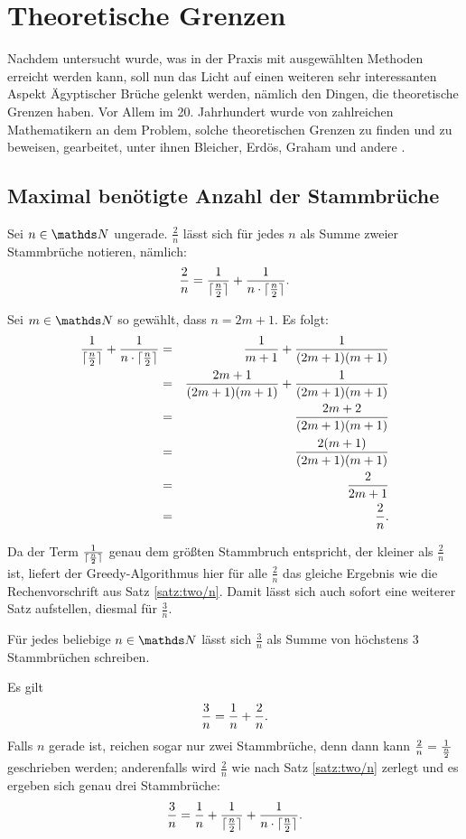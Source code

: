 \section{Theoretische Grenzen}\label{sec:theorie}
Nachdem untersucht wurde, was in der Praxis mit ausgewählten Methoden erreicht werden kann, soll nun das Licht auf einen weiteren sehr interessanten Aspekt Ägyptischer Brüche gelenkt werden, nämlich den Dingen, die theoretische Grenzen haben. Vor Allem im 20. Jahrhundert wurde von zahlreichen Mathematikern an dem Problem, solche theoretischen Grenzen zu finden und zu beweisen, gearbeitet, unter ihnen Bleicher, Erdös, Graham und andere \cite[S.87 ff]{Guy1981}.

\subsection{Maximal benötigte Anzahl der Stammbrüche}
\begin{satz}\label{satz:two/n}
	Sei $n \in \N$ ungerade. $\frac{2}{n}$ lässt sich für jedes $n$ als Summe zweier Stammbrüche notieren, nämlich:
	$$\frac{2}{n} = \frac{1}{\lceil \frac{n}{2} \rceil} + \frac{1}{n \cdot \lceil \frac{n}{2} \rceil}.$$
\end{satz}
\begin{bew}
	Sei $m \in \N$ so gewählt, dass $n=2m+1$. Es folgt:
	\begin{eqnarray*}
		\frac{1}{\lceil \frac{n}{2} \rceil} + \frac{1}{n \cdot \lceil \frac{n}{2} \rceil} & = & \frac{1}{m+1} + \frac{1}{(2m+1)(m+1)}\\
		& = & \frac{2m+1}{(2m+1)(m+1)} + \frac{1}{(2m+1)(m+1)}\\
		& = & \frac{2m+2}{(2m+1)(m+1)}\\
		& = & \frac{2(m+1)}{(2m+1)(m+1)}\\
		& = & \frac{2}{2m+1}\\
		& = & \frac{2}{n}.
	\end{eqnarray*}
\end{bew}

Da der Term $\frac{1}{\lceil \frac{n}{2} \rceil}$ genau dem größten Stammbruch entspricht, der kleiner als $\frac{2}{n}$ ist, liefert der Greedy-Algorithmus hier für alle $\frac{2}{n}$ das gleiche Ergebnis wie die Rechenvorschrift aus Satz \ref{satz:two/n}. Damit lässt sich auch sofort eine weiterer Satz aufstellen, diesmal für $\frac{3}{n}$.

\begin{satz}
	Für jedes beliebige $n \in \N$ lässt sich $\frac{3}{n}$ als Summe von höchstens 3 Stammbrüchen schreiben.
\end{satz}
\begin{bew}
	Es gilt
	$$\frac{3}{n} = \frac{1}{n} + \frac{2}{n}.$$
	Falls $n$ gerade ist, reichen sogar nur zwei Stammbrüche, denn dann kann $\frac{2}{n} = \frac{1}{\frac{n}{2}}$ geschrieben werden; anderenfalls wird $\frac{2}{n}$ wie nach Satz \ref{satz:two/n} zerlegt und es ergeben sich genau drei Stammbrüche:
	$$\frac{3}{n} = \frac{1}{n} + \frac{1}{\lceil \frac{n}{2} \rceil} + \frac{1}{n \cdot \lceil \frac{n}{2} \rceil}.$$
\end{bew}

